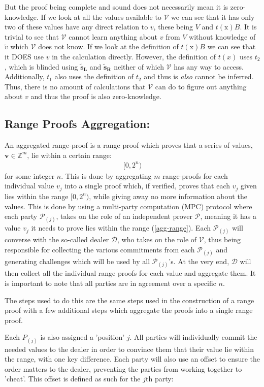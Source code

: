 \documentclass{article}
\newcommand{\eqn}[2]{\begin{equation}\label{#1}\begin{split}#2\end{split}\end{equation}}
\renewcommand{\vec}[1]{\boldsymbol{#1}}
\newcommand{\ran}[1]{\mathrm{#1}}
\newcommand{\V}{\mathcal{V}}
\renewcommand{\P}{\mathcal{P}}
\newcommand{\D}{\mathcal{D}}
\newcommand{\Z}{\mathbb{Z}}
\newcommand{\opn}[1]{\operatorname{#1}}
\newcommand{\vecl}[1]{\vec{#1_{\opn{L}}}}
\newcommand{\vecr}[1]{\vec{#1_{\opn{R}}}}
\newcommand{\blind}[1]{\widetilde{#1}}
\newcommand{\bv}{\blind{v}}
\newcommand{\bs}{\blind{s}}
\begin{document}
But the proof being complete and sound does not necessarily mean it is
zero-knowledge. If we look at all the values available to $\V$ we can 
see that it has only two of these values have any direct relation to 
$v$, these being $V$ and $t(\ran{x})B$. It is trivial to see that $\V$ 
cannot learn anything about $v$ from $V$ without knowledge of $\bv$ 
which $\V$ does not know. If we look at the definition of $t(\ran{x})B$ 
we can see that it DOES use $v$ in the calculation directly. However,
the definition of $t(x)$ uses $t_2$, which is blinded using
$\vecl{\bs}$ and $\vecr{\bs}$ neither of which $\V$ has any way
to access. Additionally, $t_1$ also uses the definition of $t_2$ and
thus is \textit{also} cannot be inferred. Thus, there is no amount
of calculations that $\V$ can do to figure out anything about $v$
and thus the proof is also zero-knowledge.

\subsection{Range Proofs Aggregation:} \label{range-proof-aggregation}

An aggregated range-proof is a range proof which proves that a series
of values, $\vec{v} \in \Z^m$, lie within a certain range:
\eqn{agg-range}{
	[0,2^n)
}
for some integer $n$. This is done by aggregating $m$ range-proofs for
each individual value $v_j$ into a single proof which, if verified,
proves that each $v_j$ given lies within the range $[0,2^n)$, while
giving away no more information about the values. This is done by using
a multi-party computation (MPC) protocol where each party $\P_{(j)}$,
takes on the role of an independent prover $\P$, meaning it has a value
$v_j$ it needs to prove lies within the range (\ref{agg-range}). Each
$\P_{(j)}$ will converse with the so-called dealer $\D$, who takes on
the role of $\V$, thus being responsible for collecting the various
commitments from each $\P_{(j)}$ and generating challenges which will
be used by all $\P_{(j)}$'s. At the very end, $\D$ will then collect
all the individual range proofs for each value and aggregate them. It is
important to note that all parties are in agreement over a specific $n$.

The steps used to do this are the same steps used in the construction
of a range proof with a few additional steps which aggregate the proofs
into a single range proof.

Each $P_{(j)}$ is also assigned a 'position' $j$. All parties will
individually commit the needed values to the dealer in order to
convince them that their value lie within the range, with one key
difference. Each party will also use an offset to ensure the order 
matters to the dealer, preventing the parties from working together 
to 'cheat'. This offset is defined as such for the $j$th party:
\end{document}
